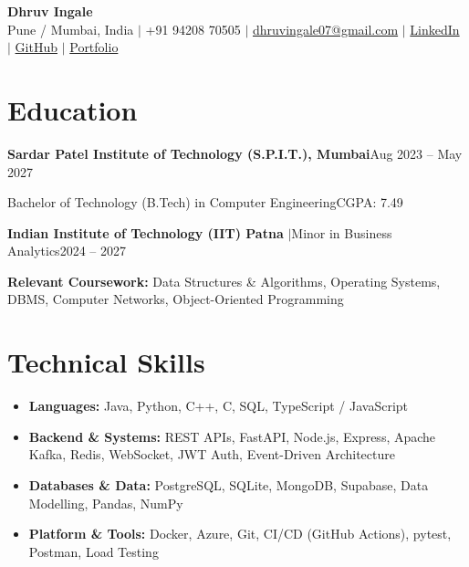 \documentclass[a4paper,10pt]{article}
\newcommand{\sep}{\unskip\hspace{0.5em}$|$\hspace{0.5em}\ignorespaces}
\newlength{\entryindent}\setlength{\entryindent}{10pt}
\newcommand{\entry}[2]{\hspace*{\entryindent}#1\hfill #2\par}
\begin{document}

\begin{center}
    {\Huge\textbf{Dhruv Ingale}}\\[5pt]
    \small
    Pune / Mumbai, India \sep
    +91 94208 70505 \sep
    \href{mailto:dhruvingale07@gmail.com}{dhruvingale07@gmail.com} \sep
    \href{https://linkedin.com/in/dhruv-ingale-42637b322}{LinkedIn} \sep
    \href{https://github.com/dhruubb}{GitHub} \sep
    \href{https://bydhruv.vercel.app/}{Portfolio}
\end{center}


\section*{Education}
\entry{\textbf{Sardar Patel Institute of Technology (S.P.I.T.), Mumbai}}{Aug 2023 -- May 2027}
\entry{Bachelor of Technology (B.Tech) in Computer Engineering}{CGPA: 7.49}
\vspace{3pt}
\entry{\textbf{Indian Institute of Technology (IIT) Patna} \sep Minor in Business Analytics}{2024 -- 2027}
\vspace{3pt}
\hspace*{\entryindent}\textbf{Relevant Coursework:} Data Structures \& Algorithms, Operating Systems, DBMS, Computer Networks, Object-Oriented Programming\par


\section*{Technical Skills}
\begin{itemize}[leftmargin=10pt,label={},itemsep=3pt,topsep=2pt]
\item \textbf{Languages:} Java, Python, C++, C, SQL, TypeScript / JavaScript
\item \textbf{Backend \& Systems:} REST APIs, FastAPI, Node.js, Express, Apache Kafka, Redis, WebSocket, JWT Auth, Event-Driven Architecture
\item \textbf{Databases \& Data:} PostgreSQL, SQLite, MongoDB, Supabase, Data Modelling, Pandas, NumPy
\item \textbf{Platform \& Tools:} Docker, Azure, Git, CI/CD (GitHub Actions), pytest, Postman, Load Testing
\end{itemize}
\end{document}
